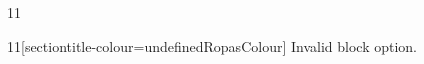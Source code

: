\documentclass[paper=A4]{ropas-poster}
\begin{document}
\begin{postergrid}{1}{1}
\begin{posterblock}{1}{1}[sectiontitle-colour=undefinedRopasColour]
Invalid block option.
\end{posterblock}
\end{postergrid}
\end{document}
